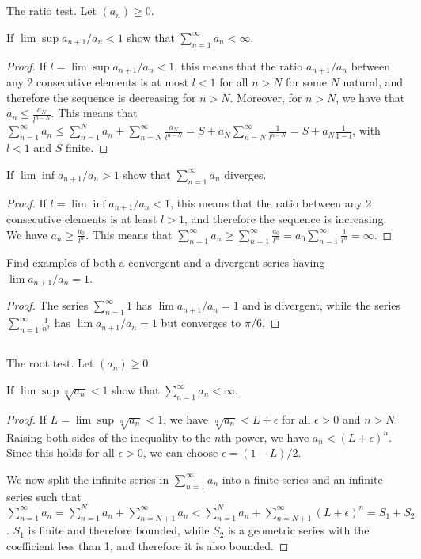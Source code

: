 \subsection{} The ratio test. Let $(a_n) \geq 0$.


If $\lim \sup a_{n+1} / a_n < 1$ show that $\sum_{n=1}^\infty a_n < \infty$.

\begin{proof}
If $l = \lim \sup a_{n+1} / a_n < 1$, this means that the ratio $a_{n+1} / a_n$ between any 2 consecutive elements is at most $l < 1$ for all $n>N$ for some $N$ natural, and therefore the sequence is decreasing for $n>N$. Moreover, for $n>N$, we have that $a_n \leq \frac{a_N}{l^{n-N}}$. This means that $\sum_{n=1}^\infty a_n \leq \sum_{n=1}^N a_n + \sum_{n=N}^\infty \frac{a_N}{l^{n-N}} = S + a_N \sum_{n=N}^\infty \frac{1}{l^{n-N}} = S + a_N \frac{1}{1 - l}$, with $l < 1$ and $S$ finite. 
\end{proof}

If $\lim \inf a_{n+1} / a_n > 1$ show that $\sum_{n=1}^\infty a_n$ diverges.

\begin{proof}
If $l = \lim \inf a_{n+1} / a_n < 1$, this means that the ratio between any 2 consecutive elements is at least $l > 1$, and therefore the sequence is increasing. We have $a_n \geq \frac{a_0}{l^n}$. This means that $\sum_{n=1}^\infty a_n \geq \sum_{n=1}^\infty \frac{a_0}{l^n} = a_0 \sum_{n=1}^\infty \frac{1}{l^n} = \infty$. 
\end{proof}

Find  examples of  both a  convergent and a  divergent series having $\lim a_{n+1} / a_n = 1$.

\begin{proof}
The series $\sum_{n=1}^\infty 1$ has $\lim a_{n+1} / a_n = 1$ and is divergent, while the series $\sum_{n=1}^\infty \frac{1}{n^2}$ has $\lim a_{n+1} / a_n = 1$ but converges to $\pi / 6$.
\end{proof}

\subsection{} The root test. Let $(a_n) \geq 0$.

If $\lim \sup \sqrt[n]{a_n} < 1$ show that $\sum_{n=1}^\infty a_n < \infty$.

\begin{proof}

If $L = \lim \sup \sqrt[n]{a_n} < 1$, we have $\sqrt[n]{a_n} < L + \epsilon$ for all $\epsilon > 0$ and $n > N$. Raising both sides of the inequality to the $n$th power, we have $a_n < (L + \epsilon)^n$. Since this holds for all $\epsilon > 0$, we can choose $\epsilon = (1-L)/2$.

We now split the infinite series in $\sum_{n=1}^\infty a_n$ into a finite series and an infinite series such that $\sum_{n=1}^\infty a_n = \sum_{n=1}^N a_n + \sum_{n=N+1}^\infty a_n < \sum_{n=1}^N a_n + \sum_{n=N+1}^\infty (L + \epsilon)^n = S_1 + S_2$. $S_1$ is finite and therefore bounded, while $S_2$ is a geometric series with the coefficient less than 1, and therefore it is also bounded.

\end{proof}

